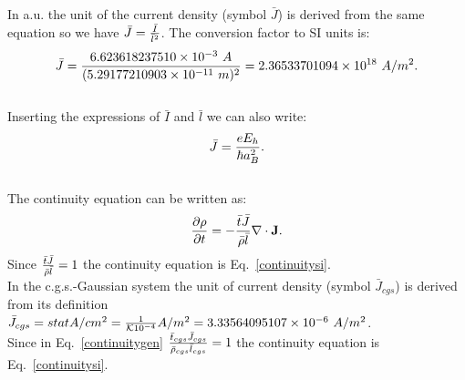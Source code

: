 \documentclass[12pt,a4paper]{article}
\def\barl{5.29177210903\times 10^{-11}}
\def\bari{6.623618237510\times 10^{-3}}
\def\barcur{2.36533701094\times 10^{18}}
\def\curtocur{3.33564095107\times 10^{-6}}
\begin{document}
{\color{web-blue} In a.u. the unit of the current density (symbol $\bar J$) 
is derived 
from the same equation so we have $\bar J ={\bar I \over \bar l^2}$. The
conversion factor to SI units is: 
\begin{equation}
\bar J = {\bari\ A\over (\barl\ m)^2}=\barcur\ A/m^2. 
\end{equation}
\\
Inserting the expressions of $\bar I$ and $\bar l$ we can also write:
\begin{equation}
\bar J = {e E_h \over \hbar a_B^2}. 
\end{equation}
\\
The continuity equation can be written as:
\begin{equation}
{\partial \rho \over \partial t}=-{\bar t \bar J \over \bar \rho \bar l} 
\nabla \cdot {\bf J}.
\label{continuitygen}
\end{equation}
Since ${\bar t \bar J \over \bar \rho \bar l}=1$ the continuity equation 
is Eq.~\ref{continuitysi}.
}
\\

{\color{orange} In the c.g.s.-Gaussian system the unit of current density  
(symbol $\bar J_{cgs}$) is derived from its definition 
$\bar J_{cgs}=statA/cm^2 = {1 \over \mathcal{K} 10^{-4}} A/m^2=\curtocur\ A/m^2$.
\\
Since in Eq.~\ref{continuitygen} ${\bar t_{cgs} \bar J_{cgs} \over 
\bar \rho_{cgs} \bar l_{cgs}}=1$ the continuity equation is 
Eq.~\ref{continuitysi}.
}
\\

\end{document}
